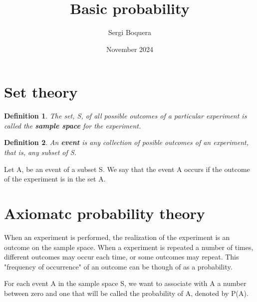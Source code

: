 \documentclass[12pt, letterpaper]{article}
\title{Basic probability}
\author{Sergi Boquera}
\date{November 2024}
\newtheorem{definition}{Definition}
\begin{document}
	\maketitle
	
	\section{Set theory}
	
		\begin{definition}
			The set, S, of all possible outcomes of a particular experiment is called the \textbf{sample space} for the experiment.
		\end{definition}
		
		\begin{definition}
			An \textbf{event} is any collection of posible outcomes of an experiment, that is, any subset of S.
		\end{definition}
		
		Let A, be an event of a subset S. We say that the event A occurs if the outcome of the experiment is in the set A.
		
	
	
	\section{Axiomatc probability theory}
	
		When an experiment is performed, the realization of the experiment is an outcome on the sample space. When a experiment is repeated a number of times, different outcomes may occur each time, or some outcomes may repeat. This "frequency of occurrence" of an outcome can be though of as a probability.\newline
		
		
		For each event A in the sample space S, we want to associate with A a number between zero and one that will be called the probability of A, denoted by P(A).
		
	
	
	
\end{document}
